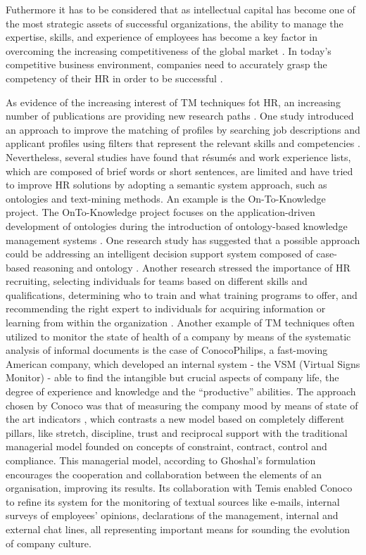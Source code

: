 \documentclass[]{book}
\begin{document}
Futhermore it has to be considered that as intellectual capital has
become one of the most strategic assets of successful organizations, the
ability to manage the expertise, skills, and experience of employees has
become a key factor in overcoming the increasing competitiveness of the
global market \citep{colucci2003formal}. In today's competitive business
environment, companies need to accurately grasp the competency of their
HR in order to be successful \citep{fazel2009semantic}.

As evidence of the increasing interest of TM techniques fot HR, an
increasing number of publications are providing new research paths
\citep[\citet{al2011investigating}, \citet{zhao2008empirical},
\citet{ccelik2012ontology}, \citet{veit2001matchmaking},
\citet{han2016preliminary}]{strohmeier2013domain}. One study introduced
an approach to improve the matching of profiles by searching job
descriptions and applicant profiles using filters that represent the
relevant skills and competencies \citep{paoletti2015extending}.
Nevertheless, several studies have found that résumés and work
experience lists, which are composed of brief words or short sentences,
are limited and have tried to improve HR solutions by adopting a
semantic system approach, such as ontologies and text-mining methods. An
example is the On-To-Knowledge project. The OnTo-Knowledge project
focuses on the application-driven development of ontologies during the
introduction of ontology-based knowledge management systems
\citep{lau2002introducing}. One research study has suggested that a
possible approach could be addressing an intelligent decision support
system composed of case-based reasoning and ontology
\citep{zhukova2014intelligent}. Another research stressed the importance
of HR recruiting, selecting individuals for teams based on different
skills and qualifications, determining who to train and what training
programs to offer, and recommending the right expert to individuals for
acquiring information or learning from within the organization
\citep{fazel2009semantic}. Another example of TM techniques often
utilized to monitor the state of health of a company by means of the
systematic analysis of informal documents is the case of ConocoPhilips,
a fast-moving American company, which developed an internal system - the
VSM (Virtual Signs Monitor) - able to find the intangible but crucial
aspects of company life, the degree of experience and knowledge and the
``productive'' abilities. The approach chosen by Conoco was that of
measuring the company mood by means of state of the art indicators
\citep{ghoshal1997individualized}, which contrasts a new model based on
completely different pillars, like stretch, discipline, trust and
reciprocal support with the traditional managerial model founded on
concepts of constraint, contract, control and compliance. This
managerial model, according to Ghoshal's formulation encourages the
cooperation and collaboration between the elements of an organisation,
improving its results. Its collaboration with Temis enabled Conoco to
refine its system for the monitoring of textual sources like e-mails,
internal surveys of employees' opinions, declarations of the management,
internal and external chat lines, all representing important means for
sounding the evolution of company culture.
\end{document}
